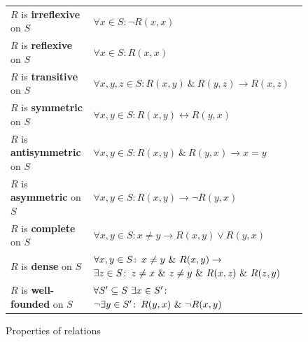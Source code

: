\enlargethispage{36pt}
\begin{figure}[!htb]
  \centering
  \begin{tabular}{lp{19em}}
    \toprule[0.05em]
    \(R\) is \textbf{irreflexive} on \(S\) &
                                             \(\forall x\in S\colon \neg R(x,x)\)\\
    \(R\) is \textbf{reflexive} on \(S\) & \(\forall x\in S\colon R(x,x)\)\\
    \(R\) is \textbf{transitive} on \(S\) &
                                            \(\forall x,y,z\in S\colon R(x,y)\ \&\ R(y,z) \rightarrow R(x,z)\)\\
    \(R\) is \textbf{symmetric} on \(S\) &
                                           \(\forall x,y\in S\colon R(x,y) \leftrightarrow R(y,x)\)\\
    \(R\) is \textbf{antisymmetric} on \(S\) &
                                               \(\forall x,y\in S\colon R(x,y)\ \&\ R(y,x) \rightarrow x=y\)\\
    \(R\) is \textbf{asymmetric} on \(S\) &
                                            \(\forall x,y\in S\colon R(x,y) \rightarrow \neg R(y,x)\)\\
    \(R\) is \textbf{complete} on \(S\) &
                                          \(\forall x,y\in S\colon x \neq y \rightarrow R(x,y) \vee R(y,x)\)\\
    \(R\) is \textbf{dense} on \(S\) &
                                       \(\forall x,y\in S\colon x \neq y \conj R(x,y) \rightarrow\)\newline
                                       \hfill\(\exists z\in S\colon z \neq x
                                       \conj z \neq y \conj R(x,z) \conj
                                       R(z,y)\)\\
    \(R\) is \textbf{well-founded} on \(S\) & \(\forall S'\subseteq S\ \exists
                                              x\in S'\co\)\newline \hfill\(\neg\exists y\in S'\co
                                              R(y,x)\ \&\ \neg R(x,y)\)\\
    \bottomrule[0.05em]
  \end{tabular}
  \caption{Properties of relations}
  \label{fig:order-properties}
\end{figure}
%
%
